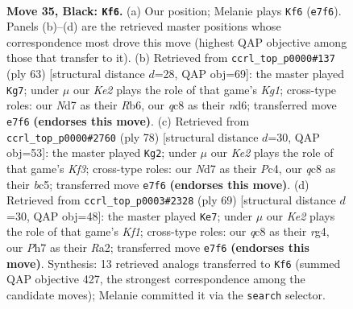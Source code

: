 \documentclass[11pt]{article}
\begin{document}
\clearpage

\begin{figure}[p]\centering
\begin{subfigure}{0.46\textwidth}\centering
\resizebox{\linewidth}{!}{%
\newchessgame
\chessboard[
  setfen={2Q5/2pnkp1p/8/8/4RP2/8/6P1/R5K1 b - - 0 35},
  showmover=false,
  pgfstyle=straightmove, color=movearrow, markmove={e7-f6}
]}
\caption{}
\end{subfigure}\hfill
\begin{subfigure}{0.46\textwidth}\centering
\resizebox{\linewidth}{!}{%
\newchessgame
\chessboard[
  setfen={3R2k1/7p/1r1N4/8/5n1p/5P2/5P2/6K1 b - - 4 32},
  showmover=false,
  pgfstyle=straightmove, color=movearrow, markmove={g8-g7}
]}
\caption{}
\end{subfigure}
\\[4pt]
\begin{subfigure}{0.46\textwidth}\centering
\resizebox{\linewidth}{!}{%
\newchessgame
\chessboard[
  setfen={R7/1p2k1N1/5p2/p1b5/2P3P1/1r3K1P/8/8 w - - 6 40},
  showmover=false,
  pgfstyle=straightmove, color=movearrow, markmove={f3-g2}
]}
\caption{}
\end{subfigure}\hfill
\begin{subfigure}{0.46\textwidth}\centering
\resizebox{\linewidth}{!}{%
\newchessgame
\chessboard[
  setfen={5k1R/p4p2/8/8/6R1/8/r4PPK/4r3 b - - 1 35},
  showmover=false,
  pgfstyle=straightmove, color=movearrow, markmove={f8-e7}
]}
\caption{}
\end{subfigure}
\caption{\textbf{Move 35, Black: \texttt{Kf6}.} (a) Our position; Melanie plays \texttt{Kf6} (\texttt{e7f6}). Panels (b)--(d) are the retrieved master positions whose correspondence most drove this move (highest QAP objective among those that transfer to it). (b) Retrieved from \texttt{ccrl\_top\_p0000\#137} (ply 63) [structural distance $d$=28, QAP obj=69]: the master played \texttt{Kg7}; under $\mu$ our \emph{Ke2} plays the role of that game's \emph{Kg1}; cross-type roles: our \emph{N}d7 as their \emph{R}b6, our \emph{q}c8 as their \emph{n}d6; transferred move \texttt{e7f6} \textbf{(endorses this move)}. (c) Retrieved from \texttt{ccrl\_top\_p0000\#2760} (ply 78) [structural distance $d$=30, QAP obj=53]: the master played \texttt{Kg2}; under $\mu$ our \emph{Ke2} plays the role of that game's \emph{Kf3}; cross-type roles: our \emph{N}d7 as their \emph{P}c4, our \emph{q}c8 as their \emph{b}c5; transferred move \texttt{e7f6} \textbf{(endorses this move)}. (d) Retrieved from \texttt{ccrl\_top\_p0003\#2328} (ply 69) [structural distance $d$=30, QAP obj=48]: the master played \texttt{Ke7}; under $\mu$ our \emph{Ke2} plays the role of that game's \emph{Kf1}; cross-type roles: our \emph{q}c8 as their \emph{r}g4, our \emph{P}h7 as their \emph{R}a2; transferred move \texttt{e7f6} \textbf{(endorses this move)}. Synthesis: 13 retrieved analogs transferred to \texttt{Kf6} (summed QAP objective 427, the strongest correspondence among the candidate moves); Melanie committed it via the \texttt{search} selector.}
\label{fig:thought-m69}
\end{figure}
\end{document}

